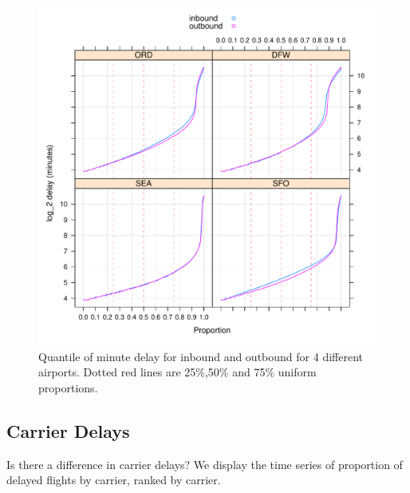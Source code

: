 \documentclass[letterpaper,10pt,english]{sphinxmanual}
\begin{document}
\begin{figure}[htbp]
\centering
\capstart

\includegraphics{quantiles_by_airport.pdf}
\caption{Quantile of minute delay for inbound and outbound for 4 different
airports. Dotted red lines are 25\%,50\% and 75\% uniform proportions.}\label{airline:quantilebyairport}\end{figure}


\subsection{Carrier Delays}
\label{airline:carrier-delays}
Is there a difference in carrier delays? We display the time series of
proportion of delayed flights by carrier, ranked by carrier.
\end{document}
